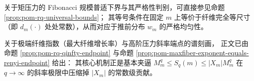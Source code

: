 \begin{remark}\label{rem:pom-fib-baseline-and-endpoint}
关于矩压力的 Fibonacci 规模普适下界与其严格性判别，可直接参见命题 \ref{prop:pom-rq-universal-bounds}；
其等号条件在固定 \(m\) 上等价于纤维完全等尺寸（即 \(d_m(\cdot)\) 处处常数），从而对应于推前分布 \(w_m\) 的严格均匀性。
\par
关于极端纤维指数（最大纤维增长率）与高阶压力斜率端点的谱刻画，
正文已由命题 \ref{prop:pom-rq-qinfty-endpoint} 与命题 \ref{prop:pom-maxfiber-exponent-equals-renyi-endpoint} 给出：
其核心机制正是基本夹逼 \(M_m^q\le S_q(m)\le |X_m|M_m^q\) 在 \(q\to\infty\) 的斜率极限中压缩掉 \(|X_m|\) 的常数级贡献。
\end{remark}

